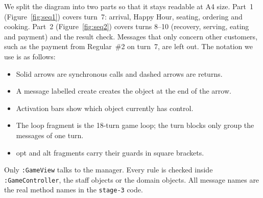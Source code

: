 We split the diagram into two parts so that it stays readable at A4 size. Part~1 (Figure~\ref{fig:seq1}) covers turn~7: arrival, Happy Hour, seating, ordering and cooking. Part~2 (Figure~\ref{fig:seq2}) covers turns 8--10 (recovery, serving, eating and payment) and the result check. Messages that only concern other customers, such as the payment from Regular~\#2 on turn~7, are left out. The notation we use is as follows:
\begin{itemize}[nosep]
  \item Solid arrows are synchronous calls and dashed arrows are returns.
  \item A message labelled \guillemotleft create\guillemotright{} creates the object at the end of the arrow.
  \item Activation bars show which object currently has control.
  \item The \textsf{loop} fragment is the 18-turn game loop; the \textsf{turn} blocks only group the messages of one turn.
  \item \textsf{opt} and \textsf{alt} fragments carry their guards in square brackets.
\end{itemize}
\begin{sloppypar}
Only \texttt{:GameView} talks to the manager. Every rule is checked inside \texttt{:GameController}, the staff objects or the domain objects. All message names are the real method names in the \texttt{stage-3} code.
\end{sloppypar}

